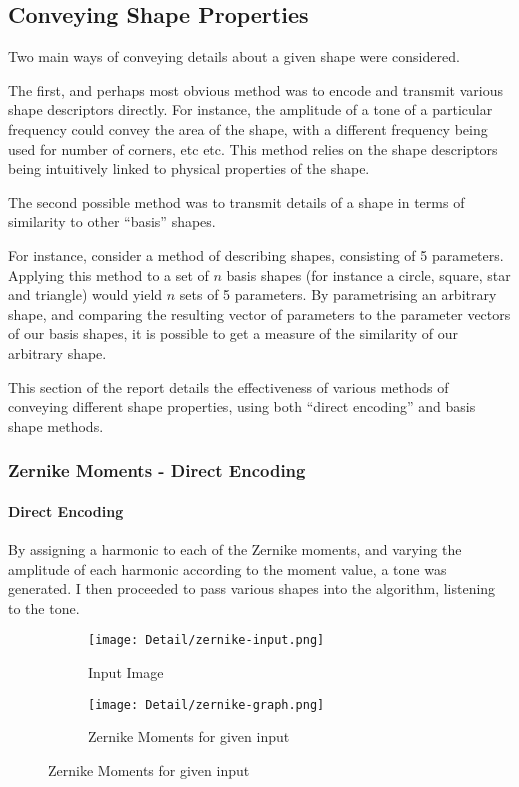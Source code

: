 \subsection{Conveying Shape Properties}
Two main ways of conveying details about a given shape were considered.

The first, and perhaps most obvious method was to encode and transmit various shape descriptors directly. For instance, the amplitude of a tone of a particular frequency could convey the area of the shape, with a different frequency being used for number of corners, etc etc. This method relies on the shape descriptors being intuitively linked to physical properties of the shape.

The second possible method was to transmit details of a shape in terms of similarity to other ``basis'' shapes.

For instance, consider a method of describing shapes, consisting of 5 parameters. Applying this method to a set of $n$ basis shapes (for instance a circle, square, star and triangle) would yield $n$ sets of 5 parameters. By parametrising an arbitrary shape, and comparing the resulting vector of parameters to the parameter vectors of our basis shapes, it is possible to get a measure of the similarity of our arbitrary shape.

This section of the report details the effectiveness of various methods of conveying different shape properties, using both ``direct encoding'' and basis shape methods.

\subsubsection{Zernike Moments - Direct Encoding}
\paragraph{Direct Encoding}
By assigning a harmonic to each of the Zernike moments, and varying the amplitude of each harmonic according to the moment value, a tone was generated. I then proceeded to pass various shapes into the algorithm, listening to the tone.

\begin{figure}[H]
    \centering
    \begin{subfigure}[h]{0.2\textwidth}
        \centering
        \texttt{[image: Detail/zernike-input.png]}
        \caption{Input Image}
    \end{subfigure}
    \begin{subfigure}[h]{0.7\textwidth}
        \centering
        \texttt{[image: Detail/zernike-graph.png]}
        \caption{Zernike Moments for given input}
    \end{subfigure}
\end{figure}

